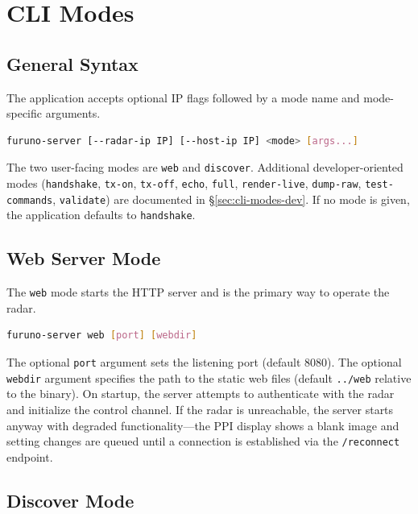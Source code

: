 \documentclass[11pt,letterpaper]{article}
\begin{document}
\section{CLI Modes}
\label{sec:cli-modes-user}

\subsection{General Syntax}
\label{subsec:cli-syntax}

The application accepts optional IP flags followed by a mode name and mode-specific arguments.

\begin{lstlisting}[language=bash]
furuno-server [--radar-ip IP] [--host-ip IP] <mode> [args...]
\end{lstlisting}

The two user-facing modes are \texttt{web} and \texttt{discover}. Additional developer-oriented modes (\texttt{handshake}, \texttt{tx-on}, \texttt{tx-off}, \texttt{echo}, \texttt{full}, \texttt{render-live}, \texttt{dump-raw}, \texttt{test-commands}, \texttt{validate}) are documented in \S\ref{sec:cli-modes-dev}. If no mode is given, the application defaults to \texttt{handshake}.

\subsection{Web Server Mode}
\label{subsec:cli-web}

The \texttt{web} mode starts the HTTP server and is the primary way to operate the radar.

\begin{lstlisting}[language=bash]
furuno-server web [port] [webdir]
\end{lstlisting}

The optional \texttt{port} argument sets the listening port (default 8080). The optional \texttt{webdir} argument specifies the path to the static web files (default \texttt{../web} relative to the binary). On startup, the server attempts to authenticate with the radar and initialize the control channel. If the radar is unreachable, the server starts anyway with degraded functionality---the PPI display shows a blank image and setting changes are queued until a connection is established via the \texttt{/reconnect} endpoint.

\subsection{Discover Mode}
\label{subsec:cli-discover}
\end{document}
